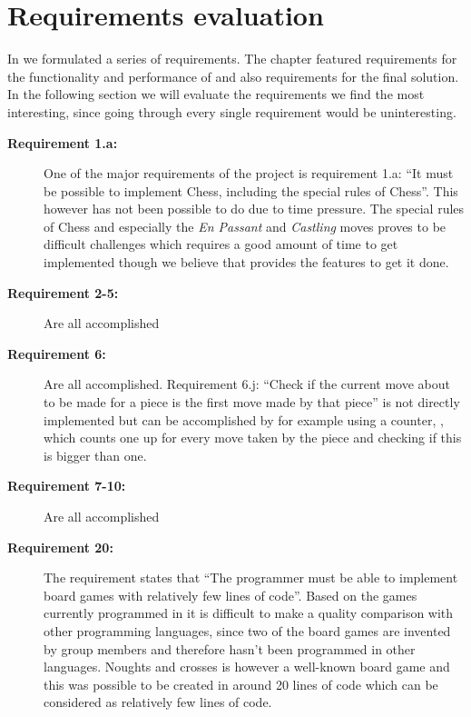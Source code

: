 \section{Requirements evaluation}
\label{sec:requirementsevaluation}

In  we formulated a series of requirements. The chapter featured requirements for the functionality and performance of \productname{} and also requirements for the final solution. In the following section we will evaluate the requirements we find the most interesting, since going through every single requirement would be uninteresting. 

\begin{description}
\item[\textbf{Requirement 1.a:}]
One of the major requirements of the project is requirement 1.a: ``It must be possible to implement Chess, including the special rules of Chess''. This however has not been possible to do due to time pressure. The special rules of Chess and especially the \emph{En Passant} and \emph{Castling} moves proves to be difficult challenges which requires a good amount of time to get implemented though we believe that \productname{} provides the features to get it done.

\item[\textbf{Requirement 2-5:}]
Are all accomplished

\item[\textbf{Requirement 6:}]
Are all accomplished. Requirement 6.j: ``Check if the current move about to be made for a piece is the first move made by that piece'' is not directly implemented but can be accomplished by for example using a counter, , which counts one up for every move taken by the piece and checking if this is bigger than one.

\item[\textbf{Requirement 7-10:}]
Are all accomplished



\item[\textbf{Requirement 20:}]
The requirement states that ``The programmer must be able to implement board games with relatively few lines of code''. Based on the games currently programmed in \productname{} it is difficult to make a quality comparison with other programming languages, since two of the board games are invented by group members and therefore hasn't been programmed in other languages. Noughts and crosses is however a well-known board game and this was possible to be created in around 20 lines of code which can be considered as relatively few lines of code.





\end{description} 